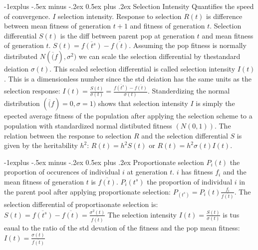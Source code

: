 \documentclass[10pt,landscape]{article}
\makeatletter
\renewcommand{\subsection}{\@startsection{subsection}{2}{0mm}%
                                {-1explus -.5ex minus -.2ex}%
                                {0.5ex plus .2ex}%
                                {\normalfont\normalsize\bfseries}}
\makeatother
\begin{document}
\begin{multicols}{3}
\subsection{Selection Intensity}
Quantifies the speed of convergence. $I$ selection intensity. Response to
selection $R(t)$ is difference between mean fitness of generation $t+1$ and fitness
of generation $t$. Selection differential $S(t)$ is the diff between parent pop
at generation $t$ and mean fitness of generation $t$. 
$S(t)=\overline{f(t^s)}-\overline{f(t)}$. Assuming the pop fitness is normally
distributed $N(\overline(f),\sigma^2)$ we can scale the selection differential
by thestandard deiation $\sigma(t)$. This scaled selection differential is 
called selection intensity $I(t)$. This is a dimensionless number since 
the std deiation has the same units as the selection response:
$I(t)=\frac{S(t)}{\sigma(t)}=\frac{\overline{f(t^s)}-\overline{f(t)}}{\sigma(t)}$.
Standerdizing the normal distribution $(\overline(f)=0,\sigma=1)$ shows that
selection intensity $I$ is simply the epected average fitness
of the population after applying the selection scheme to a population
with standardized normal distibuted fitness $(N(0,1))$.
The relation between the response to selection $R$ and the selection
differential $S$ is given by the heritability $h^2$: $R(t)=h^2S(t)$ or
$R(t)=h^2\sigma(t)I(t)$.

\subsection{Proportionate selection}
$P_i(t)$ the proportion of occurences of individual $i$ at generation $t$.
$i$ has fitness $f_i$ and the mean fitness of generation $t$ is $\overline{f(t)}$.
$P_i(t^s)$ the proportion of individual $i$ in the parent pool
after applying proportionate selection: $P_(t^s)=P_i(t)\frac{f_i}{\overline{f(t)}}$.
The selection differential of proportiaonate selection is: 
$S(t)=\overline{f(t^s)}-\overline{f(t)}=\frac{\sigma^2(t)}{\overline{f(t)}}$
The selection intensity $I(t)=\frac{S(t)}{\sigma(t)}$ is tus eaual
to the ratio of the std devation of the fitness and the pop mean fitness:
$I(t)=\frac{\sigma(t)}{\overline{f(t)}}$


\end{multicols}
\end{document}
